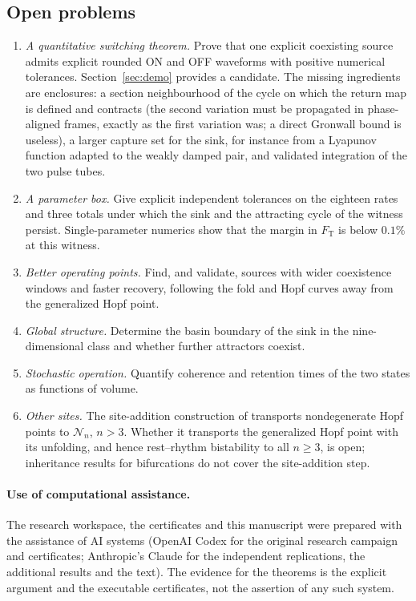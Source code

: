 \documentclass[11pt,a4paper]{article}
\theoremstyle{plain}
\theoremstyle{definition}
\theoremstyle{remark}
\newcommand{\cN}{\mathcal N}
\newcommand{\FT}{F_{\mathrm T}}
\begin{document}
\subsection{Open problems}
\begin{enumerate}[leftmargin=*]
\item \emph{A quantitative switching theorem.} Prove that one explicit coexisting source admits explicit rounded ON and OFF waveforms with positive numerical tolerances. Section~\ref{sec:demo} provides a candidate. The missing ingredients are enclosures: a section neighbourhood of the cycle on which the return map is defined and contracts (the second variation must be propagated in phase-aligned frames, exactly as the first variation was; a direct Gronwall bound is useless), a larger capture set for the sink, for instance from a Lyapunov function adapted to the weakly damped pair, and validated integration of the two pulse tubes.
\item \emph{A parameter box.} Give explicit independent tolerances on the eighteen rates and three totals under which the sink and the attracting cycle of the witness persist. Single-parameter numerics show that the margin in $\FT$ is below $0.1\%$ at this witness.
\item \emph{Better operating points.} Find, and validate, sources with wider coexistence windows and faster recovery, following the fold and Hopf curves away from the generalized Hopf point.
\item \emph{Global structure.} Determine the basin boundary of the sink in the nine-dimensional class and whether further attractors coexist.
\item \emph{Stochastic operation.} Quantify coherence and retention times of the two states as functions of volume.
\item \emph{Other sites.} The site-addition construction of \cite{CompanionOscillations} transports nondegenerate Hopf points to $\cN_n$, $n>3$. Whether it transports the generalized Hopf point with its unfolding, and hence rest--rhythm bistability to all $n\ge3$, is open; inheritance results for bifurcations \cite{BanajiBorosHofbauer25} do not cover the site-addition step.
\end{enumerate}

\paragraph{Use of computational assistance.} The research workspace, the certificates and this manuscript were prepared with the assistance of AI systems (OpenAI Codex for the original research campaign and certificates; Anthropic's Claude for the independent replications, the additional results and the text). The evidence for the theorems is the explicit argument and the executable certificates, not the assertion of any such system.
\end{document}
